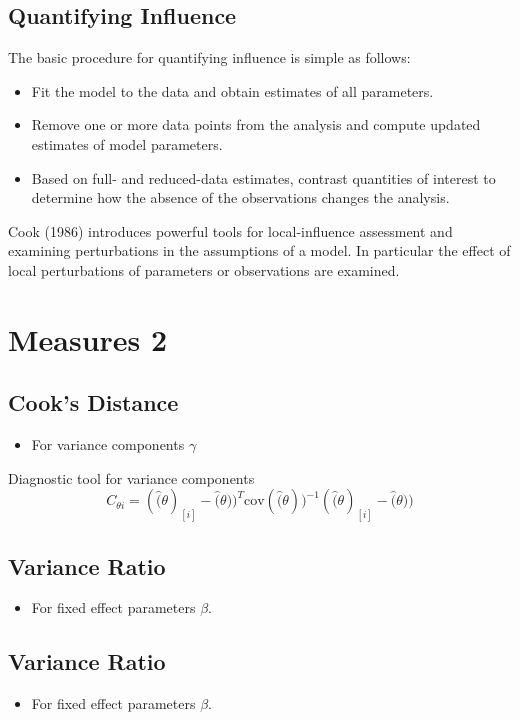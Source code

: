 \documentclass[12pt, a4paper]{report}
\begin{document}
\subsection{Quantifying Influence}  %

The basic procedure for quantifying influence is simple as follows:

\begin{itemize}
	\item Fit the model to the data and obtain estimates of all parameters.
	\item Remove one or more data points from the analysis and compute updated estimates of model parameters.
	\item Based on full- and reduced-data estimates, contrast quantities of interest to determine how the absence of the observations changes the analysis.
\end{itemize}

Cook (1986) introduces powerful tools for local-influence assessment and examining perturbations in the assumptions of a model. In particular the effect of local perturbations of parameters or observations are examined.

\newpage
\section{Measures 2} %

\subsection{Cook's Distance} %
\begin{itemize}
	\item For variance components $\gamma$
\end{itemize}

Diagnostic tool for variance components
\[ C_{\theta i} =(\hat(\theta)_{[i]} - \hat(\theta))^{T}\mbox{cov}( \hat(\theta))^{-1}(\hat(\theta)_{[i]} - \hat(\theta))\]


\subsection{Variance Ratio} %
\begin{itemize}
	\item For fixed effect parameters $\beta$.
\end{itemize}

\subsection{Variance Ratio} %
\begin{itemize}
	\item For fixed effect parameters $\beta$.
\end{itemize}
\end{document}
